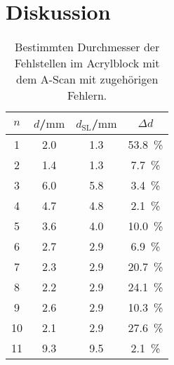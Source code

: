 \section{Diskussion}
\label{sec:Diskussion}
\begin{table}
  \centering
	\caption{Bestimmten Durchmesser der Fehlstellen im Acrylblock mit dem A-Scan mit zugehörigen Fehlern.}
	\label{tab:werte_ascan}
	\begin{tabular}{cccc}
		\toprule
		$n$ & $d$/$\si{\milli\meter}$ & $d_{\mathrm{SL}}$/$\si{\milli\meter}$ & $\Delta d$ \\
		\midrule
		1 & 2.0 & 1.3 & \SI{53.8}{\percent} \\
		2 & 1.4 & 1.3 & \SI{7.7}{\percent} \\
		3 & 6.0 & 5.8 & \SI{3.4}{\percent} \\
		4 & 4.7 & 4.8 & \SI{2.1}{\percent} \\
		5 & 3.6 & 4.0 & \SI{10.0}{\percent} \\
		6 & 2.7 & 2.9 & \SI{6.9}{\percent} \\
		7 & 2.3 & 2.9 & \SI{20.7}{\percent} \\
		8 & 2.2 & 2.9 & \SI{24.1}{\percent} \\
		9 & 2.6 & 2.9 & \SI{10.3}{\percent} \\
		10 & 2.1 & 2.9 & \SI{27.6}{\percent} \\
		11 & 9.3 & 9.5 & \SI{2.1}{\percent} \\
		\bottomrule
	\end{tabular}
\end{table}

